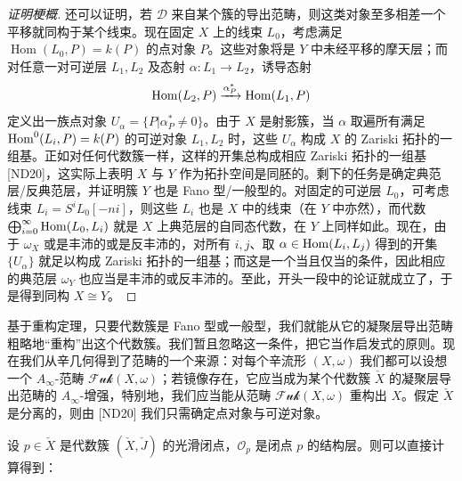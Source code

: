 \begin{proof}[证明梗概]
还可以证明，若 $\mathcal{D}$ 来自某个簇的导出范畴，则这类对象至多相差一个平移就同构于某个线束。现在固定 $X$ 上的线束 $L_0$，考虑满足 $\operatorname{Hom}(L_0,P)=k(P)$ 的点对象 $P$。这些对象将是 $Y$ 中未经平移的摩天层；而对任意一对可逆层 $L_1,L_2$ 及态射 $\alpha\colon L_1\to L_2$，诱导态射
\[
  \operatorname{Hom}(L_2,P)\xrightarrow{\alpha_P^{\ast}}\operatorname{Hom}(L_1,P)
\]
定义出一族点对象 $U_{\alpha}=\{P\vert\alpha_P^{\ast}\neq 0\}$。由于 $X$ 是射影簇，当 $\alpha$ 取遍所有满足 $\operatorname{Hom}^0(L_i,P)=k(P)$ 的可逆对象 $L_1,L_2$ 时，这些 $U_{\alpha}$ 构成 $X$ 的 Zariski 拓扑的一组基。正如对任何代数簇一样，这样的开集总构成相应 Zariski 拓扑的一组基 [ND20]，这实际上表明 $X$ 与 $Y$ 作为拓扑空间是同胚的。剩下的任务是确定典范层/反典范层，并证明簇 $Y$ 也是 Fano 型/一般型的。对固定的可逆层 $L_0$，可考虑线束 $L_i=S^iL_0[-ni]$，则这些 $L_i$ 也是 $X$ 中的线束（在 $Y$ 中亦然），而代数 $\bigoplus_{i=0}^{\infty}\operatorname{Hom}(L_0,L_i)$ 就是 $X$ 上典范层的自同态代数，在 $Y$ 上同样如此。现在，由于 $\omega_X$ 或是丰沛的或是反丰沛的，对所有 $i,j$、取 $\alpha\in\operatorname{Hom}(L_i,L_j)$ 得到的开集 $\{U_{\alpha}\}$ 就足以构成 Zariski 拓扑的一组基；而这是一个当且仅当的条件，因此相应的典范层 $\omega_Y$ 也应当是丰沛的或反丰沛的。至此，开头一段中的论证就成立了，于是得到同构 $X\cong Y$。

\end{proof}

基于重构定理，只要代数簇是 Fano 型或一般型，我们就能从它的凝聚层导出范畴粗略地“重构”出这个代数簇。我们暂且忽略这一条件，把它当作启发式的原则。现在我们从辛几何得到了范畴的一个来源：对每个辛流形 $(X,\omega)$ 我们都可以设想一个 $A_{\infty}$-范畴 $\mathcal{Fuk}(X,\omega)$；若镜像存在，它应当成为某个代数簇 $\check{X}$ 的凝聚层导出范畴的 $A_{\infty}$-增强，特别地，我们应当能从范畴 $\mathcal{Fuk}(X,\omega)$ 重构出 $X$。假定 $\check{X}$ 是分离的，则由 [ND20] 我们只需确定点对象与可逆对象。



设 $p\in\check{X}$ 是代数簇 $(\check{X},\check{J})$ 的光滑闭点，$\mathcal{O}_p$ 是闭点 $p$ 的结构层。则可以直接计算得到：

